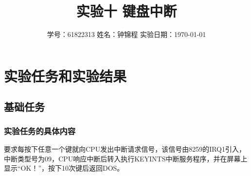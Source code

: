 \documentclass[12pt, a4paper, oneside]{ctexart}
\title{实验十 \qquad  键盘中断}
\author{学号：61822313 \qquad 姓名：钟锦程 \qquad 实验日期：\today}
\date{}
\begin{document}
\maketitle
\section{实验任务和实验结果}
\subsection{基础任务}
\subsubsection{实验任务的具体内容}
要求每按下任意一个键就向CPU发出中断请求信号，该信号由8259的IRQ1引入，中断类型号为09，CPU响应中断后转入执行KEYINTS中断服务程序，并在屏幕上显示“OK！”，按下10次键后返回DOS。
\end{document}

